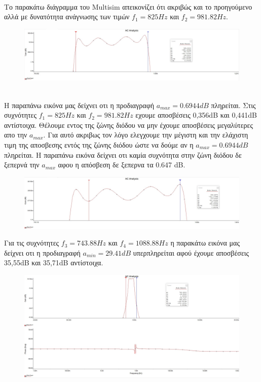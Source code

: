 \documentclass{article}
\begin{document}
{{\begin{figure}[h!]
\end{figure} \\
Tο παρακάτω διάγραμμα του Multisim απεικονίζει ότι ακριβώς και το προηγούμενο αλλά με δυνατότητα ανάγνωσης των τιμών $f_1 = 825Hz$ και $f_2 = 981.82Hz$.
\begin{figure}[h!]
\centering
 	\advance\leftskip-2cm
  \includegraphics[width=150mm,scale=2]{thema2/multisim2a.jpg}
\end{figure} \\
Η παραπάνω εικόνα μας δείχνει οτι η προδιαγραφή $a_{max} = 0.6944dB$ πληρείται. Στις συχνότητες $f_1 = 825Hz$ και $f_2 = 981.82Hz$ εχουμε αποσβέσεις 0,356dB και 0,441dB αντίστοιχα.
\clearpage
Θέλουμε εντος της ζώνης διόδου να μην έχουμε αποσβέσεις μεγαλύτερες απο την $a_{max}$. Για αυτό ακριβως τον λόγο ελεγχουμε την μέγιστη και την ελάχιστη τιμη της αποσβεσης εντός της ζώνης διόδου ώστε να δούμε αν  η $a_{max} = 0.6944dB$ πληρείται. Η παραπάνω εικόνα δείχνει οτι καμία συχνότητα στην ζώνη διόδου δε ξεπερνά την $a_{max}$ αφου η απόσβεση δε ξεπερνα τα 0.647 dB.}
\begin{figure}[h!]
\centering
 	\advance\leftskip-1cm
  \includegraphics[width=140mm,scale=2]{thema2/multisim3a.jpg}
\end{figure} 

Για τις συχνότητες $f_3 = 743.88Hz$ και $f_4 = 1088.88Hz$  η παρακάτω εικόνα μας δείχνει οτι η προδιαγραφή $a_{min} = 29.41 dB$ υπερπληρείται αφού  έχουμε αποσβέσεις 35,55dB και 35,71dB αντίστοιχα.

\begin{figure}[h!]
\centering
 	\advance\leftskip-1cm
  \includegraphics[width=150mm,scale=2]{thema2/matlab5a.jpg}
\end{figure} 

}
\end{document}
